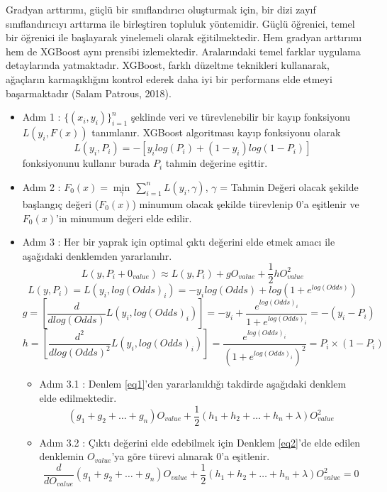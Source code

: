 \documentclass[12pt,twoside]{deuthesis}
\providecommand{\tightlist}{%
  \setlength{\itemsep}{0pt}\setlength{\parskip}{0pt}}
\begin{document}
Gradyan arttırımı, güçlü bir sınıflandırıcı oluşturmak için, bir dizi zayıf sınıflandırıcıyı arttırma ile birleştiren topluluk yöntemidir. Güçlü öğrenici, temel bir öğrenici ile başlayarak yinelemeli olarak eğitilmektedir. Hem gradyan arttırımı hem de XGBoost aynı prensibi izlemektedir. Aralarındaki temel farklar uygulama detaylarında yatmaktadır. XGBoost, farklı düzeltme teknikleri kullanarak, ağaçların karmaşıklığını kontrol ederek daha iyi bir performans elde etmeyi başarmaktadır (Salam Patrous, 2018).
\begin{itemize}
\item
  Adım 1 : \(\{(x_i,y_i)\}_{i=1}^n\) şeklinde veri ve türevlenebilir bir kayıp fonksiyonu \(L(y_i,F(x))\) tanımlanır. XGBoost algoritması kayıp fonksiyonu olarak \[L(y_i,P_i) = -[y_{i}log(P_i)+(1-y_i)log(1-P_i)]\] fonksiyonunu kullanır burada \(P_i\) tahmin değerine eşittir.
\item
  Adım 2 : \(F_0(x) = \min\limits_{\gamma}\,\sum_{i=1}^{n}L(y_i,\gamma)\), \(\gamma\) = Tahmin Değeri olacak şekilde başlangıç değeri (\(F_0(x)\)) minumum olacak şekilde türevlenip 0'a eşitlenir ve \(F_0(x)\)'in minumum değeri elde edilir.
\item
  Adım 3 : Her bir yaprak için optimal çıktı değerini elde etmek amacı ile aşağıdaki denklemden yararlanılır.
  \begin{equation}
    \label{eq1}
    L(y,P_i+0_{value}) \approx L(y,P_i) + gO_{value} + \frac{1}{2}hO_{value}^2
  \end{equation}
  \[
  L(y,P_i) = L(y_i,log(Odds)_i) = -y_{i}log(Odds) + log\left(1 + e^{log(Odds)}\right)
  \]
  \[
    g = \left[\frac{d}{dlog(Odds)}L(y_i,log(Odds)_i)\right] = -y_i + \frac{e^{log(Odds)_i}}{1 + e^{log(Odds)_i}} = -(y_i - P_i)
  \]
  \[
    h = \left[\frac{d^2}{dlog(Odds)^2}L(y_i,log(Odds)_i)\right] = \frac{e^{log(Odds)_i}}{(1 + e^{log(Odds)_i})^2} = P_i\times (1-P_i)
  \]
  \begin{itemize}
  \tightlist
  \item
    Adım 3.1 : Denlem \ref{eq1}'den yararlanıldığı takdirde aşağıdaki denklem elde edilmektedir.
    \begin{equation}
      (g_1 + g_2 + \ldots + g_n)O_{value} + \frac{1}{2}(h_1 + h_2 + \ldots + h_n + \lambda)O_{value}^2
      \label{eq2}
      \end{equation}
  \item
    Adım 3.2 : Çıktı değerini elde edebilmek için Denklem \ref{eq2}'de elde edilen denklemin \(O_{value}\)'ya göre türevi alınarak 0'a eşitlenir.
    \[
      \frac{d}{dO_{value}} (g_1 + g_2 + \ldots + g_n)O_{value} + \frac{1}{2}(h_1 + h_2 + \ldots + h_n + \lambda)O_{value}^2 = 0
\]
\end{itemize}
\end{itemize}
\end{document}
